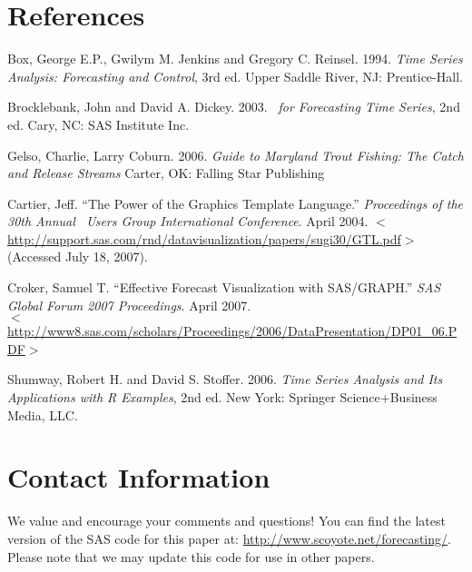 \documentclass[10pt]{sugconf-ish}
\begin{document}
\section{References}

\begin{list}{}{\setlength{\leftmargin}{2em}\setlength{\itemindent}{0em}\raggedright}
\item Box, George E.P., Gwilym M. Jenkins and Gregory C. Reinsel. 1994. 
\emph{Time Series Analysis: Forecasting and Control}, 3rd ed. Upper Saddle River, NJ: Prentice-Hall.

\item Brocklebank, John and David A. Dickey. 2003. 
\emph{\SASregistered\ for Forecasting Time Series}, 2nd ed. Cary, NC: SAS Institute Inc.

\item Gelso, Charlie, Larry Coburn. 2006. \emph{Guide to Maryland Trout Fishing:  The Catch and Release Streams} Carter, OK: Falling Star Publishing

\item Cartier, Jeff. ``The Power of the Graphics Template Language.'' \emph{Proceedings of the 30th Annual \SASregistered\ Users Group International Conference}. April 2004. %
$<$\url{http://support.sas.com/rnd/datavisualization/papers/sugi30/GTL.pdf}$>$ (Accessed July 18, 2007).

\item Croker, Samuel T. ``Effective Forecast Visualization with SAS/GRAPH.'' \emph{SAS Global Forum 2007 Proceedings}. April 2007. \\ $<$\url{http://www8.sas.com/scholars/Proceedings/2006/DataPresentation/DP01_06.PDF}$>$

\item Shumway, Robert H. and David S. Stoffer. 2006. 
\emph{Time Series Analysis and Its Applications with R Examples}, 2nd ed. New York: Springer Science+Business Media, LLC.
\end{list}





\newpage
\section{Contact Information}
We value and encourage your comments and questions! You can find the latest version of the SAS code for this paper at: \url{http://www.scoyote.net/forecasting/}. Please note that we may update this code for use in other papers.
\end{document}
